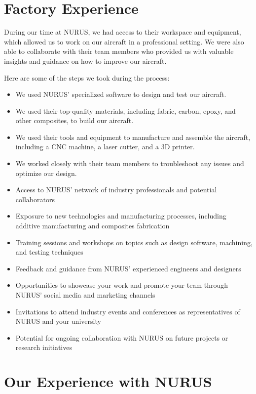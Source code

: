 \documentclass{article}
\begin{document}
\section{Factory Experience}

During our time at NURUS, we had access to their workspace and equipment, which allowed us to work on our aircraft in a professional setting. We were also able to collaborate with their team members who provided us with valuable insights and guidance on how to improve our aircraft.

Here are some of the steps we took during the process:

\begin{itemize}
    \item We used NURUS' specialized software to design and test our aircraft.
    \item We used their top-quality materials, including fabric, carbon, epoxy, and other composites, to build our aircraft.
    \item We used their tools and equipment to manufacture and assemble the aircraft, including a CNC machine, a laser cutter, and a 3D printer.
    \item We worked closely with their team members to troubleshoot any issues and optimize our design.  
	\item Access to NURUS' network of industry professionals and potential collaborators
	\item Exposure to new technologies and manufacturing processes, including additive manufacturing and composites fabrication
	\item Training sessions and workshops on topics such as design software, machining, and testing techniques
	\item Feedback and guidance from NURUS' experienced engineers and designers
	\item Opportunities to showcase your work and promote your team through NURUS' social media and marketing channels
	\item Invitations to attend industry events and conferences as representatives of NURUS and your university
	\item Potential for ongoing collaboration with NURUS on future projects or research initiatives
\end{itemize}

\section{Our Experience with NURUS}
\end{document}
